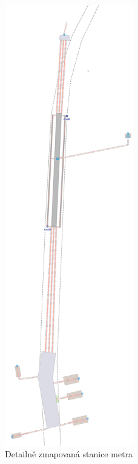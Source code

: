 \begin{figure}
  \centering
    \includegraphics[width=0.5\textwidth]{../img/andel.pdf}
  \caption{Detailně zmapovaná stanice metra}
  \label{fig:metro-detail}
\end{figure}

